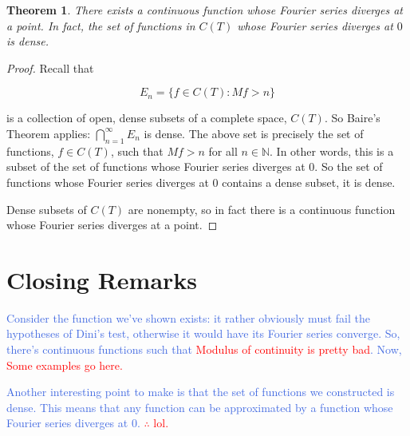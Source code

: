 \documentclass{amsart}
\newcommand{\N}{\mathbb{N}}
\newcommand{\colorcomment}[2]{\textcolor{#1}{#2}} %
\newtheorem{thm}{Theorem}[section]
\theoremstyle{definition}
\begin{document}
\begin{thm}
There exists a continuous function whose Fourier series diverges at a point.
In fact, the set of functions in $C(T)$ whose Fourier series diverges at $0$ is dense.
\end{thm}

\begin{proof}

Recall that 

\begin{displaymath}
E_n = \{f \in C(T) : Mf > n\}
\end{displaymath}

is a collection of open, dense subsets of a complete space, $C(T)$. 
So Baire's Theorem applies: $\bigcap\limits_{n=1}^\infty E_n $ is dense.
The above set is precisely the set of functions, $f \in C(T)$, such that $Mf >n$ for all $n \in \N$.
In other words, this is a subset of the set of functions whose Fourier series diverges at $0$.
So the set of functions whose Fourier series diverges at $0$ contains a dense subset, it is dense.

Dense subsets of $C(T)$ are nonempty, so in fact there is a continuous function whose Fourier series diverges at a point.

\end{proof}

\section{Closing Remarks}

\colorcomment{RoyalBlue}{Consider the function we've shown exists: it rather obviously must fail the hypotheses of Dini's test, otherwise it would have its Fourier series converge. 
So, there's continuous functions such that \colorcomment{red}{Modulus of continuity is pretty bad}.
Now, \colorcomment{red}{Some examples go here.}}

\colorcomment{RoyalBlue}{Another interesting point to make is that the set of functions we constructed is dense. 
This means that any function can be approximated by a function whose Fourier series diverges at $0$. 
\colorcomment{red}{$\therefore$ lol.}}
\end{document}
